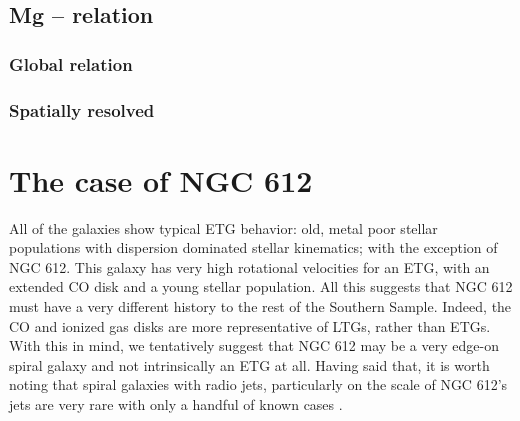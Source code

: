 	\subsection{Mg -- \textsigma relation}
		\label{subsec:Mgsigma}

		\subsubsection{Global relation}

		\subsubsection{Spatially resolved}

\section{The case of NGC 612}
	\label{sec:NGC612}
	All of the galaxies show typical ETG behavior: old, metal poor stellar populations with dispersion dominated stellar kinematics; with the exception of NGC 612. This galaxy has very high rotational velocities for an ETG, with an extended CO disk and a young stellar population. All this suggests that NGC 612 must have a very different history to the rest of the Southern Sample. Indeed, the CO and ionized gas disks are more representative of LTGs, rather than ETGs. With this in mind, we tentatively suggest that NGC 612 may be a very edge-on spiral galaxy and not intrinsically an ETG at all. Having said that, it is worth noting that spiral galaxies with radio jets, particularly on the scale of NGC 612's jets are very rare with only a handful of known cases \citep{}. 